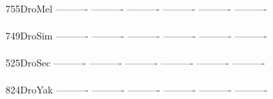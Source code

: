 \documentclass[11pt,twoside,reqno,a4paper]{article}
\begin{document}
{\\
755\hspace*{2\charwidth}DroMel	----------	----------	----------	----------	----------	----------	\\
\hspace*{5\charwidth}\hspace*{7\charwidth}\hspace*{1\charwidth}\hspace*{1\charwidth}\hspace*{1\charwidth}\hspace*{1\charwidth}\hspace*{1\charwidth}\hspace*{1\charwidth}\\
749\hspace*{2\charwidth}DroSim	----------	----------	----------	----------	----------	----------	\\
\hspace*{5\charwidth}\hspace*{7\charwidth}\hspace*{1\charwidth}\hspace*{1\charwidth}\hspace*{1\charwidth}\hspace*{1\charwidth}\hspace*{1\charwidth}\hspace*{1\charwidth}\\
525\hspace*{2\charwidth}DroSec	----------	----------	----------	----------	----------	----------	\\
\hspace*{5\charwidth}\hspace*{7\charwidth}\hspace*{1\charwidth}\hspace*{1\charwidth}\hspace*{1\charwidth}\hspace*{1\charwidth}\hspace*{1\charwidth}\hspace*{1\charwidth}\\
824\hspace*{2\charwidth}DroYak	----------	----------	----------	----------	----------	----------	\\
\hspace*{5\charwidth}\hspace*{7\charwidth}\hspace*{1\charwidth}\hspace*{1\charwidth}\hspace*{1\charwidth}\hspace*{1\charwidth}\hspace*{1\charwidth}\hspace*{1\charwidth}\\
}
\end{document}

